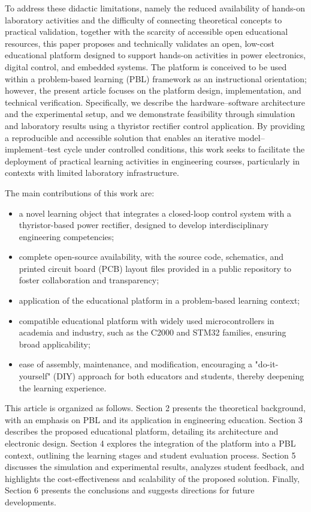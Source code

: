 \documentclass[english]{textolivre}
\begin{document}
To address these didactic limitations, namely the reduced availability of hands-on laboratory activities and the difficulty of connecting theoretical concepts to practical validation, together with the scarcity of accessible open educational resources, this paper proposes and technically validates an open, low-cost educational platform designed to support hands-on activities in power electronics, digital control, and embedded systems. The platform is conceived to be used within a problem-based learning (PBL) framework as an instructional orientation; however, the present article focuses on the platform design, implementation, and technical verification. Specifically, we describe the hardware–software architecture and the experimental setup, and we demonstrate feasibility through simulation and laboratory results using a thyristor rectifier control application. By providing a reproducible and accessible solution that enables an iterative model–implement–test cycle under controlled conditions, this work seeks to facilitate the deployment of practical learning activities in engineering courses, particularly in contexts with limited laboratory infrastructure.

The main contributions of this work are:
\begin{itemize}
    \item a novel learning object that integrates a closed-loop control system with a thyristor-based power rectifier, designed to develop interdisciplinary engineering competencies;
    \item complete open-source availability, with the source code, schematics, and printed circuit board (PCB) layout files provided in a public repository to foster collaboration and transparency;
    \item application of the educational platform in a problem-based learning context;
    \item compatible educational platform with widely used microcontrollers in academia and industry, such as the C2000 and STM32 families, ensuring broad applicability;
    \item ease of assembly, maintenance, and modification, encouraging a "do-it-yourself" (DIY) approach for both educators and students, thereby deepening the learning experience.
\end{itemize}

This article is organized as follows. Section 2 presents the theoretical background, with an emphasis on PBL and its application in engineering education. Section 3 describes the proposed educational platform, detailing its architecture and electronic design. Section 4 explores the integration of the platform into a PBL context, outlining the learning stages and student evaluation process. Section 5 discusses the simulation and experimental results, analyzes student feedback, and highlights the cost-effectiveness and scalability of the proposed solution. Finally, Section 6 presents the conclusions and suggests directions for future developments.
\end{document}
